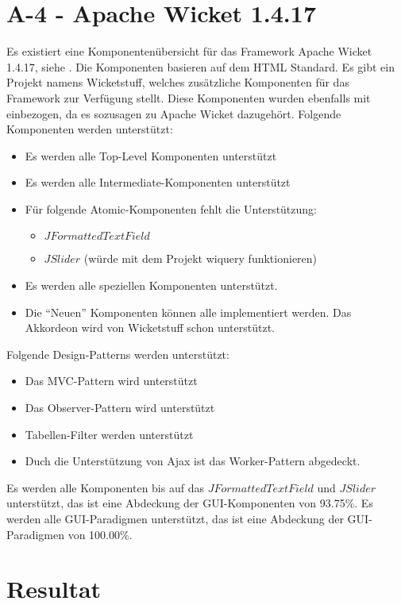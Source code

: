 \section{A-4 - Apache Wicket 1.4.17}

Es existiert eine Komponentenübersicht für das Framework Apache Wicket 1.4.17,
siehe \cite{WicketComponents}. Die Komponenten basieren auf dem \ac{HTML}
Standard. Es gibt ein Projekt namens Wicketstuff, welches zusätzliche
Komponenten für das Framework zur Verfügung stellt. Diese Komponenten wurden
ebenfalls mit einbezogen, da es sozusagen zu Apache Wicket dazugehört. Folgende
Komponenten werden unterstützt:

\begin{itemize}
  \item Es werden alle Top-Level Komponenten unterstützt
  \item Es werden alle Intermediate-Komponenten unterstützt
  \item Für folgende Atomic-Komponenten fehlt die Unterstützung:
  \begin{itemize}
    \item \(JFormattedTextField\)
    \item \(JSlider\) (würde mit dem Projekt wiquery funktionieren)
  \end{itemize}
  \item Es werden alle speziellen Komponenten unterstützt.
  \item Die ``Neuen'' Komponenten können alle implementiert werden. Das
  Akkordeon wird von Wicketstuff schon unterstützt.
\end{itemize}

Folgende Design-Patterns werden unterstützt:

\begin{itemize}
  \item Das MVC-Pattern wird unterstützt
  \item Das Observer-Pattern wird unterstützt
  \item Tabellen-Filter werden unterstützt
  \item Duch die Unterstützung von Ajax ist das Worker-Pattern abgedeckt.
\end{itemize}

Es werden alle Komponenten bis auf das \(JFormattedTextField\) und
\(JSlider\) unterstützt, das ist eine Abdeckung der GUI-Komponenten von 93.75\%.
Es werden alle GUI-Paradigmen unterstützt, das ist eine Abdeckung der
GUI-Paradigmen von 100.00\%.

\section{Resultat}

